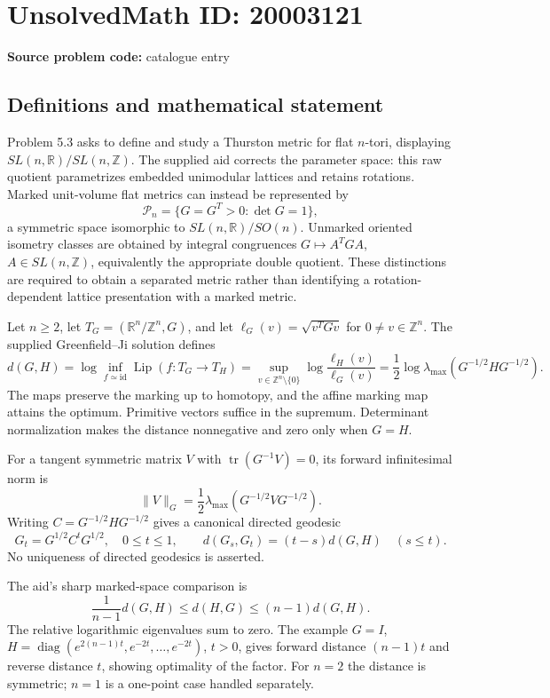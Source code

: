 \documentclass[11pt]{article}
\newcommand{\Z}{\mathbb{Z}}
\newcommand{\R}{\mathbb{R}}
\begin{document}
\section*{UnsolvedMath ID: 20003121}
\textbf{Source problem code:} catalogue entry
\subsection{Definitions and mathematical statement}
Problem 5.3 asks to define and study a Thurston metric for flat $n$-tori, displaying $SL(n,\R)/SL(n,\Z)$. The supplied aid corrects the parameter space: this raw quotient parametrizes embedded unimodular lattices and retains rotations. Marked unit-volume flat metrics can instead be represented by
\[
 \mathcal P_n=\{G=G^T>0:\det G=1\},
\]
a symmetric space isomorphic to $SL(n,\R)/SO(n)$. Unmarked oriented isometry classes are obtained by integral congruences $G\mapsto A^TGA$, $A\in SL(n,\Z)$, equivalently the appropriate double quotient. These distinctions are required to obtain a separated metric rather than identifying a rotation-dependent lattice presentation with a marked metric.

Let $n\geq2$, let $T_G=(\R^n/\Z^n,G)$, and let $\ell_G(v)=\sqrt{v^TGv}$ for $0\ne v\in\Z^n$. The supplied Greenfield--Ji solution defines
\[
 d(G,H)=\log\inf_{f\simeq\mathrm{id}}\operatorname{Lip}(f:T_G\to T_H)
       =\sup_{v\in\Z^n\setminus\{0\}}
                \log\frac{\ell_H(v)}{\ell_G(v)}
       =\frac12\log\lambda_{\max}(G^{-1/2}HG^{-1/2}).
\]
The maps preserve the marking up to homotopy, and the affine marking map attains the optimum. Primitive vectors suffice in the supremum. Determinant normalization makes the distance nonnegative and zero only when $G=H$.

For a tangent symmetric matrix $V$ with $\operatorname{tr}(G^{-1}V)=0$, its forward infinitesimal norm is
\[
 \|V\|_G=\frac12\lambda_{\max}(G^{-1/2}VG^{-1/2}).
\]
Writing $C=G^{-1/2}HG^{-1/2}$ gives a canonical directed geodesic
\[
 G_t=G^{1/2}C^tG^{1/2},\quad0\leq t\leq1,
 \qquad d(G_s,G_t)=(t-s)d(G,H)\quad(s\leq t).
\]
No uniqueness of directed geodesics is asserted.

The aid's sharp marked-space comparison is
\[
 \frac1{n-1}d(G,H)\leq d(H,G)\leq(n-1)d(G,H).
\]
The relative logarithmic eigenvalues sum to zero. The example $G=I$, $H=\operatorname{diag}(e^{2(n-1)t},e^{-2t},\ldots,e^{-2t})$, $t>0$, gives forward distance $(n-1)t$ and reverse distance $t$, showing optimality of the factor. For $n=2$ the distance is symmetric; $n=1$ is a one-point case handled separately.
\end{document}
